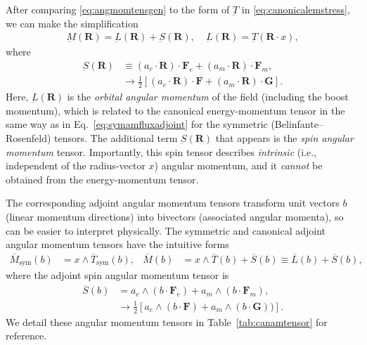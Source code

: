 \documentclass[1p,sort&compress]{elsarticle}
\numberwithin{equation}{section}
\newcommand{\bv}[1]{\mathbf{#1}}
\begin{document}
After comparing \eqref{eq:angmomtensgen} to the form of $\underbar{T}$ in \eqref{eq:canonicalemstress}, we can make the simplification
\begin{align}\label{eq:angmomtens}
  \underbar{M}(\bv{R}) = \underbar{L}(\bv{R}) + \underbar{S}(\bv{R}), ~~~~~ 
\underbar{L}(\bv{R}) = \underbar{T}(\bv{R}\cdot x),
\end{align}
where
\begin{align}\label{eq:spinmom}
  \underbar{S}(\bv{R}) &\equiv (a_e\cdot \bv{R})\cdot\bv{F}_e + (a_m\cdot \bv{R})\cdot\bv{F}_m, \\
  &\to \frac{1}{2}[(a_e\cdot \bv{R})\cdot\bv{F} + (a_m\cdot \bv{R})\cdot\bv{G}]. \nonumber
\end{align}
Here, $\underbar{L}(\bv{R})$ is the \emph{orbital angular momentum} of the field (including the boost momentum), which is related to the canonical energy-momentum tensor in the same way as in Eq.~\eqref{eq:symamfluxadjoint} for the symmetric (Belinfante--Rosenfeld) tensors. The additional term $\underbar{S}(\bv{R})$ that appears is the \emph{spin angular momentum} tensor.  Importantly, this spin tensor describes \emph{intrinsic} (i.e., independent of the radius-vector $x$) angular momentum, and it \emph{cannot} be obtained from the energy-momentum tensor. 

The corresponding adjoint angular momentum tensors transform unit vectors $b$ (linear momentum directions) into bivectors (associated angular momenta), so can be easier to interpret physically.  The symmetric and canonical adjoint angular momentum tensors have the intuitive forms
\begin{align}\label{eq:angmomtensadjoint}
  \overline{M}_{\text{sym}}(b) &= x\wedge\overline{T}_{\text{sym}}(b), & \overline{M}(b) &= x\wedge \overline{T}(b) + \overline{S}(b) \equiv \overline{L}(b)+\overline{S}(b), 
\end{align}
where the adjoint spin angular momentum tensor is
\begin{align}\label{eq:spinmomadjoint}
  \overline{S}(b) &= a_e\wedge(b \cdot \bv{F}_e)+a_m\wedge(b\cdot \bv{F}_m),  \\
  &\to \frac{1}{2}[a_e\wedge (b\cdot \bv{F})+ a_m\wedge(b\cdot \bv{G}))]. \nonumber
\end{align}
We detail these angular momentum tensors in Table~\ref{tab:canamtensor} for reference.
\end{document}
